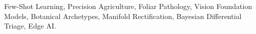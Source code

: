 \documentclass[conference]{IEEEtran}
\begin{document}
\begin{IEEEkeywords}
Few-Shot Learning, Precision Agriculture, Foliar Pathology, Vision Foundation Models, Botanical Archetypes, Manifold Rectification, Bayesian Differential Triage, Edge AI.
\end{IEEEkeywords}












\end{document}
